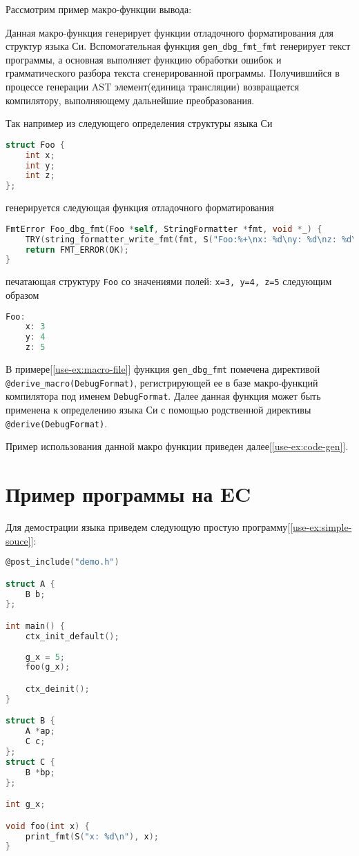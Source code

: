 Рассмотрим пример макро-функции вывода:


Данная макро-функция генерирует функции отладочного форматирования для структур языка Си.
Вспомогательная функция \verb|gen_dbg_fmt_fmt| генерирует текст программы, а основная выполняет функцию обработки ошибок и грамматического разбора текста сгенерированной программы.
Получившийся в процессе генерации AST элемент(единица трансляции) возвращается компилятору, выполняющему дальнейшие преобразования.

Так например из следующего определения структуры языка Си
\begin{lstlisting}[language=C]
struct Foo {
    int x;
    int y;
    int z;
};
\end{lstlisting}

генерируется следующая функция отладочного форматирования
\begin{lstlisting}[language=C]
FmtError Foo_dbg_fmt(Foo *self, StringFormatter *fmt, void *_) {
    TRY(string_formatter_write_fmt(fmt, S("Foo:%+\nx: %d\ny: %d\nz: %d\n%-"), self->x, self->y, self->z));
    return FMT_ERROR(OK);
}
\end{lstlisting}

печатающая структуру \verb|Foo| со значениями полей: \verb|x=3, y=4, z=5| следующим образом
\begin{lstlisting}[language=C]
Foo:
    x: 3
    y: 4
    z: 5
\end{lstlisting}

В примере[\ref{use-ex:macro-file}] функция \verb|gen_dbg_fmt| помечена директивой \verb|@derive_macro(DebugFormat)|, регистрирующей ее в базе макро-функций компилятора под именем \verb|DebugFormat|.
Далее данная функция может быть применена к определению языка Си с помощью родственной директивы \verb|@derive(DebugFormat)|.

Пример использования данной макро функции приведен далее[\ref{use-ex:code-gen}].

\section{Пример программы на EC}
\label{use-ex:simple}

Для демострации языка приведем следующую простую программу[\ref{use-ex:simple-souce}]:
\begin{lstlisting}[language=C, caption={simple.ec}, label={use-ex:simple-souce}]
@post_include("demo.h")

struct A {
    B b;
};

int main() {
    ctx_init_default();
    
    g_x = 5;
    foo(g_x);

    ctx_deinit();
}

struct B {
    A *ap;
    C c;
};
struct C {
    B *bp;
};

int g_x;

void foo(int x) {
    print_fmt(S("x: %d\n"), x);
}
\end{lstlisting}

